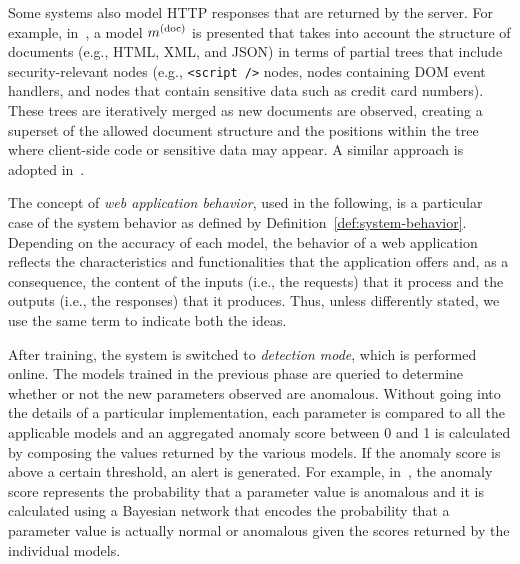 Some systems also model \ac{HTTP} responses that are
returned by the server. For example,
in~\citep{kruegel:jcn2005:webanomaly}, a model $m^{\left(\text{doc}\right)}$ is presented
that takes into account the structure of documents (e.g.,
\ac{HTML}, \ac{XML}, and \ac{JSON})
in terms of partial trees that include security-relevant nodes (e.g.,
\texttt{<script />} nodes, nodes containing \ac{DOM} event
handlers, and nodes that contain sensitive data such as credit card
numbers). These trees are iteratively merged as new documents are
observed, creating a superset of the allowed document structure and
the positions within the tree where client-side code or sensitive data
may appear. A similar approach is adopted
in~\citep{masibty}.

\begin{note}
  The concept of \emph{web application behavior}, used in the
  following, is a particular case of the system behavior as defined by
  Definition~\ref{def:system-behavior}. Depending on the accuracy of
  each model, the behavior of a web application reflects the
  characteristics and functionalities that the application offers and,
  as a consequence, the content of the inputs (i.e., the requests)
  that it process and the outputs (i.e., the responses) that it
  produces. Thus, unless differently stated, we use the same term to
  indicate both the ideas.
\end{note}

After training, the system is switched to \emph{detection mode}, which
is performed online. The models trained in the previous phase are
queried to determine whether or not the new parameters observed are
anomalous. Without going into the details of a particular
implementation, each parameter is compared to all the applicable
models and an aggregated anomaly score between 0 and 1 is calculated
by composing the values returned by the various models. If the anomaly
score is above a certain threshold, an alert is generated. For
example, in~\citep{kruegel:acsac2003:bayesian}, the anomaly score
represents the probability that a parameter value is anomalous and it
is calculated using a Bayesian network that encodes the probability
that a parameter value is actually normal or anomalous given the
scores returned by the individual models.

